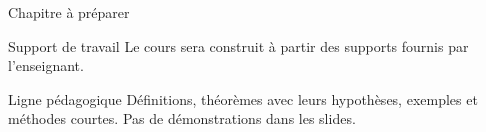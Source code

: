 \begin{frame}[t]{Chapitre à préparer}
\coursanalyse
\begin{cours}{Support de travail}
Le cours sera construit à partir des supports fournis par l'enseignant.
\end{cours}
\begin{resultat}{Ligne pédagogique}
Définitions, théorèmes avec leurs hypothèses, exemples et méthodes courtes.
Pas de démonstrations dans les slides.
\end{resultat}
\end{frame}
